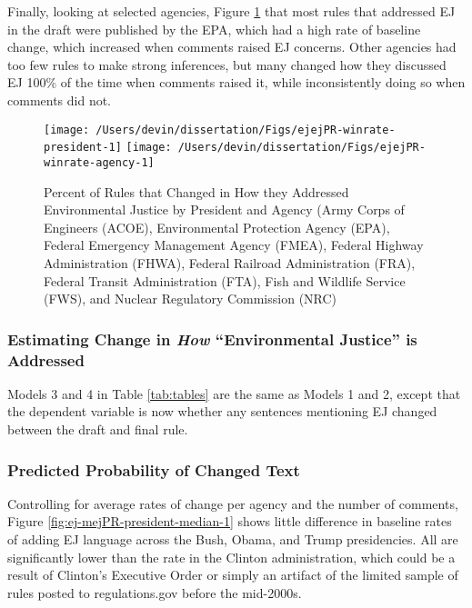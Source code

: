 \documentclass[
      12pt,
        ]{article}
\begin{document}
Finally, looking at selected agencies, Figure \ref{fig:ejejPR-winrate-2} that most rules that addressed EJ in the draft were published by the EPA, which had a high rate of baseline change, which increased when comments raised EJ concerns. Other agencies had too few rules to make strong inferences, but many changed how they discussed EJ 100\% of the time when comments raised it, while inconsistently doing so when comments did not.

\begin{figure}

{\centering \texttt{[image: /Users/devin/dissertation/Figs/ejejPR-winrate-president-1]} \texttt{[image: /Users/devin/dissertation/Figs/ejejPR-winrate-agency-1]} 

}

\caption{Percent of Rules that Changed in How they Addressed Environmental Justice by President and Agency (Army Corps of Engineers (ACOE), Environmental Protection Agency (EPA), Federal Emergency Management Agency (FMEA), Federal Highway Administration (FHWA), Federal Railroad Administration (FRA), Federal Transit Administration (FTA), Fish and Wildlife Service (FWS), and Nuclear Regulatory Commission (NRC)}\label{fig:ejejPR-winrate-2}
\end{figure}

\hypertarget{estimating-change-in-how-environmental-justice-is-addressed}{%
\subsubsection{\texorpdfstring{Estimating Change in \emph{How} ``Environmental Justice'' is Addressed}{Estimating Change in How ``Environmental Justice'' is Addressed}}\label{estimating-change-in-how-environmental-justice-is-addressed}}

Models 3 and 4 in Table \ref{tab:tables} are the same as Models 1 and 2, except that the dependent variable is now whether any sentences mentioning EJ changed between the draft and final rule.

\hypertarget{predicted-probability-of-changed-text}{%
\subsubsection{Predicted Probability of Changed Text}\label{predicted-probability-of-changed-text}}

Controlling for average rates of change per agency and the number of comments, Figure \ref{fig:ej-mejPR-president-median-1} shows little difference in baseline rates of adding EJ language across the Bush, Obama, and Trump presidencies. All are significantly lower than the rate in the Clinton administration, which could be a result of Clinton's Executive Order or simply an artifact of the limited sample of rules posted to regulations.gov before the mid-2000s.
\end{document}
